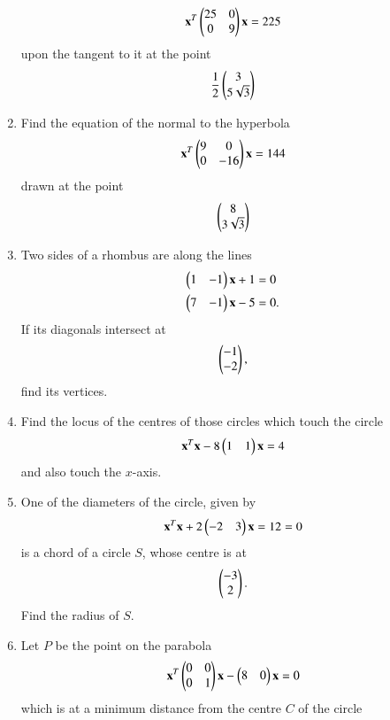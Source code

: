 \documentclass[journal,12pt,twocolumn]{IEEEtran}
\begin{document}
\begin{enumerate}[label=\arabic*.]
\begin{equation}
\mathbf{x}^T\begin{pmatrix}25 & 0 \\ 0 & 9\end{pmatrix}\mathbf{x}  = 225
\end{equation}
upon the tangent to it at the point
\begin{equation}
\frac{1}{2}\begin{pmatrix}3\\ 5 \sqrt{3}\end{pmatrix}
\end{equation}
\item Find the equation of the normal to the hyperbola
\begin{equation}
\mathbf{x}^T\begin{pmatrix}9 & 0 \\ 0 & -16\end{pmatrix}\mathbf{x}  = 144
\end{equation}
drawn at the point
\begin{equation}
\begin{pmatrix}8\\ 3 \sqrt{3}\end{pmatrix}
\end{equation}
\item Two sides of a rhombus are along the lines
\begin{align}
\begin{pmatrix}1 & -1\end{pmatrix}\mathbf{x} + 1 &=0
\\
\begin{pmatrix}7 & -1\end{pmatrix}\mathbf{x} -5 &=0.
\end{align}
%
If its diagonals intersect at 
\begin{equation}
\begin{pmatrix}-1\\ -2\end{pmatrix},
\end{equation}
find its vertices.
\item Find the locus of the centres of those circles which touch the circle
\begin{equation}
\mathbf{x}^T\mathbf{x} -8\begin{pmatrix}1 & 1 \end{pmatrix}\mathbf{x} = 4
\end{equation}
and also touch the $x$-axis.
\item One of the diameters of the circle, given by 
\begin{equation}
\mathbf{x}^T\mathbf{x} +2\begin{pmatrix}-2 & 3 \end{pmatrix}\mathbf{x} = 12
 = 0
\end{equation}
is a chord of a circle $S$, whose centre is at 
\begin{equation}
\begin{pmatrix}-3\\ 2\end{pmatrix}.
\end{equation}
Find the radius of $S$.
\item Let $P$ be the point on the parabola
\begin{equation}
\mathbf{x}^T\begin{pmatrix}0 & 0 \\ 0 & 1\end{pmatrix}\mathbf{x} -\begin{pmatrix}8 & 0 \end{pmatrix}\mathbf{x} 
 = 0
\end{equation}
which is at a minimum distance from the centre $C$ of the circle
\begin{equation}

\end{equation}
\end{enumerate}
\end{document}
